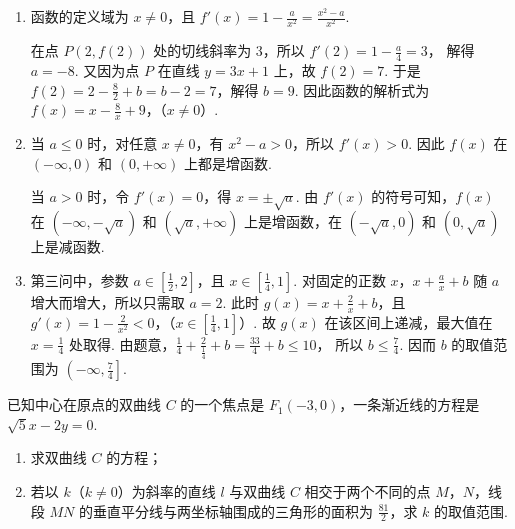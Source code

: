 \begin{solution}
\begin{enumerate}
\item
函数的定义域为 \(x\neq0\)，且
\(f'(x)=1-\frac{a}{x^2}=\frac{x^2-a}{x^2}\).

在点 \(P(2,f(2))\) 处的切线斜率为 \(3\)，所以
\(f'(2)=1-\frac{a}{4}=3\)，
解得 \(a=-8\). 又因为点 \(P\) 在直线 \(y=3x+1\) 上，故 \(f(2)=7\). 于是
\(f(2)=2-\frac82+b=b-2=7\)，解得 \(b=9\). 因此函数的解析式为 \(f(x)=x-\frac8x+9\)，（\(x\neq0\)）.

\item
当 \(a\leqslant0\) 时，对任意 \(x\neq0\)，有 \(x^2-a>0\)，所以 \(f'(x)>0\). 因此 \(f(x)\) 在 \(\left(-\infty,0\right)\) 和 \((0,+\infty)\) 上都是增函数.

当 \(a>0\) 时，令 \(f'(x)=0\)，得 \(x=\pm\sqrt{a}\). 由 \(f'(x)\) 的符号可知，\(f(x)\) 在 \(\left(-\infty,-\sqrt{a}\right)\) 和 \((\sqrt{a},+\infty)\) 上是增函数，在 \((-\sqrt{a},0)\) 和 \((0,\sqrt{a})\) 上是减函数.

\item
第三问中，参数 \(a\in\left[\frac12,2\right]\)，且 \(x\in\left[\frac14,1\right]\). 对固定的正数 \(x\)，\(x+\frac{a}{x}+b\) 随 \(a\) 增大而增大，所以只需取 \(a=2\). 此时
\(g(x)=x+\frac2x+b\)，且 \(g'(x)=1-\frac2{x^2}<0\)，（\(x\in\left[\frac14,1\right]\)）. 故 \(g(x)\) 在该区间上递减，最大值在 \(x=\frac14\) 处取得. 由题意，\(\frac14+\frac{2}{\frac{1}{4}}+b=\frac{33}{4}+b\leqslant10\)，
所以 \(b\leqslant\frac74\). 因而 \(b\) 的取值范围为 \(\left(-\infty,\frac74\right]\).
\end{enumerate}
\end{solution}

\begin{problem}
已知中心在原点的双曲线 \(C\) 的一个焦点是 \(F_{1}(-3,0)\)，一条渐近线的方程是 \(\sqrt{5} x - 2y = 0\).
\begin{enumerate}
\item 求双曲线 \(C\) 的方程；
\item 若以 \(k\)（\(k \neq 0\)）为斜率的直线 \(l\) 与双曲线 \(C\) 相交于两个不同的点 \(M\)，\(N\)，线段 \(MN\) 的垂直平分线与两坐标轴围成的三角形的面积为 \(\frac{81}{2}\)，求 \(k\) 的取值范围.
\end{enumerate}
\end{problem}

